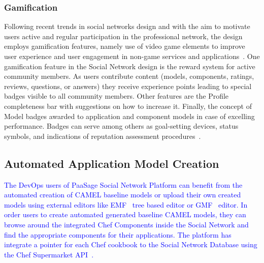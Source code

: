\subsubsection{Gamification}
Following recent trends in social networks design and with the aim to motivate users active and regular participation in
the professional network, the design employs gamification features, namely use of video game elements to improve user experience and user engagement in non-game services and applications~\cite{deterding2011gamification}. One gamification feature in the Social Network design is the reward system for active community members. As users contribute content (models, components, ratings, reviews, questions, or answers) they receive experience points leading to special badges visible to all community members. Other features are the Profile completeness bar with suggestions on how to increase it. Finally, the concept of Model badges awarded to application and component models in case of excelling performance. Badges can serve among others as goal-setting devices, status symbols, and indications of reputation assessment procedures~\cite{antin2011badges}.

\subsection{Automated Application Model Creation}
\label{sec:automatedcreation}
\textcolor{blue}{The DevOps users of PaaSage Social Network Platform can benefit from the automated creation of CAMEL baseline models or upload their own created models using external editors like EMF~\cite{cdomodel} tree based editor or GMF~\cite{gmf_url} editor. In order users to create automated generated baseline CAMEL models, they can browse around the integrated Chef Components inside the Social Network and find the appropriate components for their applications. The platform has integrate a pointer for each Chef cookbook to the Social Network Database using the Chef Supermarket API~\cite{chef_api_url}.}

